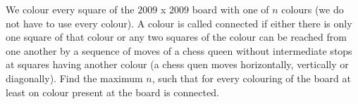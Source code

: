 We colour every square of the $ 2009$ x $ 2009$ board with one of $ n$ colours (we do not have to use every colour). A colour is called connected if either there is only one square of that colour or any two squares of the colour can be reached from one another by a sequence of moves of a chess queen without intermediate stops at squares having another colour (a chess quen moves horizontally, vertically or diagonally). Find the maximum $ n$,  such that for every colouring of the board at least on colour present at the board is connected.